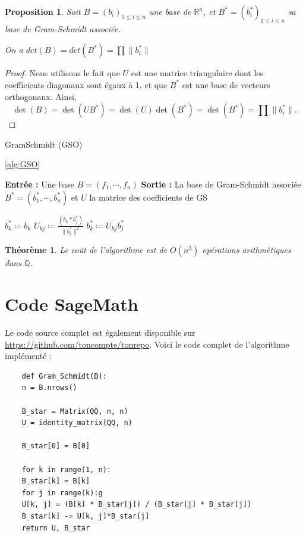 \documentclass[a4paper,12pt]{report}  %
\theoremstyle{definitionstyle}
\theoremstyle{examplestyle}
\theoremstyle{remarkstyle}
\theoremstyle{propositionstyle}
\newtheorem{proposition}{Proposition}[chapter]  %
\theoremstyle{theoremstyle}
\newtheorem{theoreme}{Théorème}[chapter]  %
\theoremstyle{proofstyle}
\begin{document}
	
	\begin{proposition}
		 Soit $B = (b_i)_{1 \leq i \leq n}$ une base de $\mathbb{R}^n$, et $B^* = (b^*_i)_{1 \leq i \leq n}$ sa base de Gram-Schmidt associée.
		 
		 On a $det(B)=det(B^*) = \prod \| b_i^*\|$
	\end{proposition}	

	\begin{proof}
		Nous utilisons le fait que \( U \) est une matrice triangulaire dont les coefficients diagonaux sont égaux à 1, et que \( B^* \) est une base de vecteurs orthogonaux. Ainsi, 
		\[\det(B) = \det(UB^*) = \det(U)\det(B^*) = \det(B^*) = \prod \| b_i^*\|.\]
	\end{proof}
	
	
	
	
	\begin{algorithm}
		\caption{GramSchmidt (GSO)}
		\label{alg:GSO} 
		\ref{alg:GSO}
		
		\begin{algorithmic}[1]
			\State \textbf{Entrée :} Une base $B=(f_1, \cdots, f_n)$
			\State \textbf{Sortie :} La base de Gram-Schmidt associée $B^*=(b^*_1, \cdots, b^*_n)$ et $U$ la matrice des coefficients de GS
			
			\State $b_k^* \coloneqq b_k$
			\State $U_{kj}\coloneqq \frac{(b_k*b_j^*)}{\|b_j^*\|^2}$
			\State $b_k^* \coloneqq U_{kj} b_j^*$
			\EndFor
			\EndFor
		\end{algorithmic}
	\end{algorithm}
	\begin{theoreme}
		Le coût de l'algorithme  est de \( O(n^3) \) opérations arithmétiques dans \( \mathbb{Q} \).
	\end{theoreme}
	
	
	\chapter{Code SageMath}
	Le code source complet est également disponible sur \url{https://github.com/toncompte/tonrepo}.
	\label{sec:annexe_code}
	Voici le code complet de l'algorithme implémenté :
	
	\begin{lstlisting}
	def Gram_Schmidt(B):
	n = B.nrows()
	
	B_star = Matrix(QQ, n, n)
	U = identity_matrix(QQ, n)
	
	B_star[0] = B[0]
	
	for k in range(1, n):
	B_star[k] = B[k]
	for j in range(k):g
	U[k, j] = (B[k] * B_star[j]) / (B_star[j] * B_star[j])
	B_star[k] -= U[k, j]*B_star[j]
	return U, B_star
	
	\end{lstlisting}
	
	
	

	
	\printbibliography
	
\end{document}
